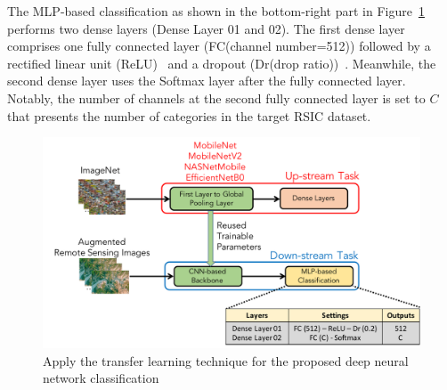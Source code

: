 \documentclass[sigconf]{acmart}
\begin{document}
The MLP-based classification as shown in the bottom-right part in Figure~\ref{fig:CAM_transfer} performs two dense layers (Dense Layer 01 and 02).
The first dense layer comprises one fully connected layer (FC(channel number=512)) followed by a rectified linear unit (ReLU)~\cite{relu} and a dropout (Dr(drop ratio))~\cite{dropout}.
Meanwhile, the second dense layer uses the Softmax layer after the fully connected layer.
Notably, the number of channels at the second fully connected layer is set to $C$ that presents the number of categories in the target RSIC dataset.
\begin{figure}[t]
    \centering
    \includegraphics[width=1.0\linewidth]{CAM_trans.pdf}
	\caption{Apply the transfer learning technique for the proposed deep neural network classification}
    \label{fig:CAM_transfer}
\end{figure}
\end{document}
